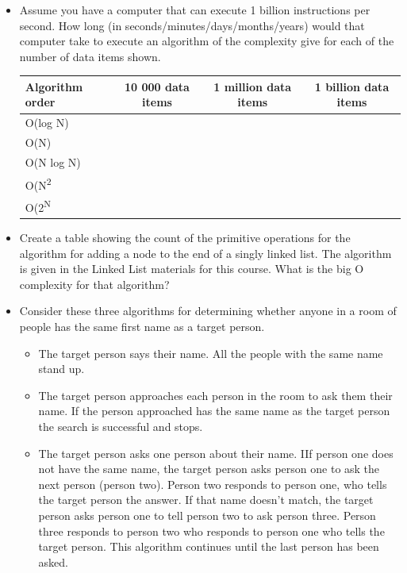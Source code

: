 \begin{itemize}


\item  Assume you have a computer that can execute 1 billion instructions per second.  How long (in seconds/minutes/days/months/years) would that computer take to execute an algorithm of the complexity give for each of the number of data items shown.

\begin{tabular}{|l|c|c|c|}
	\hline
	Algorithm order & 10 000 data items & 1 million data items & 1 billion data items\\
	\hline\hline
	O(log N)& & &\\	\hline
	O(N)& & &\\	\hline
	O(N log N) & & &\\	\hline
	O(N\textsuperscript{2}& & &\\	\hline
	O(2\textsuperscript{N}& & &\\	\hline
		\hline
\end{tabular}

\item Create a table showing the count of the primitive operations for the algorithm for adding a node to the end of a singly linked list.  The algorithm is given in the Linked List materials for this course.   What is the big O complexity for that algorithm?

\item { Consider these three algorithms for determining whether anyone in a room of people has the same first name as a target person.
\begin{itemize}
\item The target person says their name.   All the people with the same name stand up.
\item The target person approaches each person in the room to ask them their name.   If the person approached has the same name as the target person the search is successful and stops.
\item The target person asks one person about their name.  IIf person one does not have the same name,  the target person asks person one to ask the next person (person two).  Person two responds to person one,  who tells the target person the answer.  If that name doesn't match, the target person asks person one to tell person two to ask person three.   Person three responds to person two who responds to person one who tells the target person.   This algorithm continues until the last person has been asked.
\end{itemize}

}
\end{itemize}
